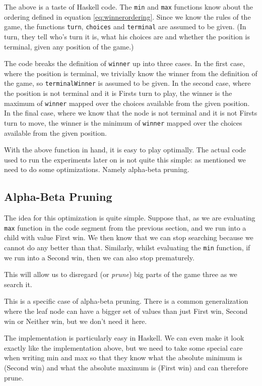 The above is a taste of Haskell code.
The \texttt{min} and \texttt{max} functions know about the ordering defined in equation \ref{eq:winnerordering}.
Since we know the rules of the game, the functions \texttt{turn}, \texttt{choices} and \texttt{terminal} are assumed to be given.
(In turn, they tell who's turn it is, what his choices are and whether the position is terminal, given any position of the game.)

The code breaks the definition of \texttt{winner} up into three cases.
In the first case, where the position is terminal, we trivially know the winner from the definition of the game, so \texttt{terminalWinner} is assumed to be given.
In the second case, where the position is not terminal and it is Firsts turn to play, the winner is the maximum of \texttt{winner} mapped over the choices available from the given position.
In the final case, where we know that the node is not terminal and it is not Firsts turn to move, the winner is the minimum of \texttt{winner} mapped over the choices available from the given position.

With the above function in hand, it is easy to play optimally.
The actual code used to run the experiments later on is not quite this simple: as mentioned we need to do some optimizations.
Namely alpha-beta pruning.

\subsection {Alpha-Beta Pruning}

The idea for this optimization is quite simple.
Suppose that, as we are evaluating \texttt{max} function in the code segment from the previous section, and we run into a child with value First win.
We then know that we can stop searching because we cannot do any better than that.
Similarly, whilst evaluating the \texttt{min} function, if we run into a Second win, then we can also stop prematurely.

This will allow us to disregard (or \emph{prune}) big parts of the game three as we search it.


This is a specific case of alpha-beta pruning.
There is a common generalization where the leaf node can have a bigger set of values than just First win, Second win or Neither win, but we don't need it here.

The implementation is particularly easy in Haskell. We can even make it look exactly like the implementation above, but we need to take some special care when writing min and max so that they know what the absolute minimum is (Second win) and what the absolute maximum is (First win) and can therefore prune.

